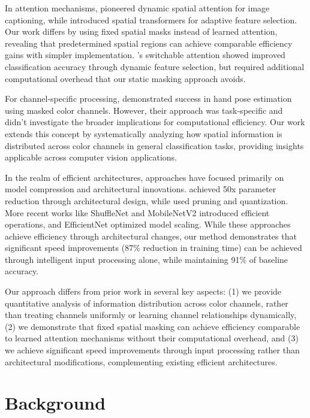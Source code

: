 \documentclass{article} %
\begin{document}
In attention mechanisms, \citet{Xu2015ShowAA} pioneered dynamic spatial attention for image captioning, while \citet{Jaderberg2015SpatialTN} introduced spatial transformers for adaptive feature selection. Our work differs by using fixed spatial masks instead of learned attention, revealing that predetermined spatial regions can achieve comparable efficiency gains with simpler implementation. \citet{Cheng2020LearnTP}'s switchable attention showed improved classification accuracy through dynamic feature selection, but required additional computational overhead that our static masking approach avoids.

For channel-specific processing, \citet{wang2018mask} demonstrated success in hand pose estimation using masked color channels. However, their approach was task-specific and didn't investigate the broader implications for computational efficiency. Our work extends this concept by systematically analyzing how spatial information is distributed across color channels in general classification tasks, providing insights applicable across computer vision applications.

In the realm of efficient architectures, approaches have focused primarily on model compression and architectural innovations. \citet{Iandola2016SqueezeNetAA} achieved 50x parameter reduction through architectural design, while \citet{Han2015DeepCC} used pruning and quantization. More recent works like ShuffleNet \citep{Zhang2017ShuffleNetAE} and MobileNetV2 \citep{Sandler2018MobileNetV2IR} introduced efficient operations, and EfficientNet \citep{Tan2019EfficientNetRM} optimized model scaling. While these approaches achieve efficiency through architectural changes, our method demonstrates that significant speed improvements {(87\% reduction in training time)} can be achieved through intelligent input processing alone, while maintaining 91\% of baseline accuracy.

Our approach differs from prior work in several key aspects: (1) we provide quantitative analysis of information distribution across color channels, rather than treating channels uniformly or learning channel relationships dynamically, (2) we demonstrate that fixed spatial masking can achieve efficiency comparable to learned attention mechanisms without their computational overhead, and (3) we achieve significant speed improvements through input processing rather than architectural modifications, complementing existing efficient architectures.

\section{Background}
\label{sec:background}
\end{document}
